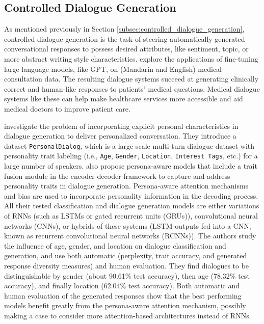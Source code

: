 \subsection{Controlled Dialogue Generation}
As mentioned previously in Section \ref{subsec:controlled_dialogue_generation}, controlled dialogue generation is the task of steering automatically generated conversational responses to possess desired attributes, like sentiment, topic, or more abstract writing style characteristics.
\cite{zeng-etal-2020-meddialog} explore the applications of fine-tuning large language models, like GPT, on (Mandarin and English) medical consultation data. The resulting dialogue systems succeed at generating clinically correct and human-like responses to patients' medical questions. Medical dialogue systems like these can help make healthcare services more accessible and aid medical doctors to improve patient care.

\cite{zheng2019personalized} investigate the problem of incorporating explicit personal characteristics in dialogue generation to deliver personalized conversation. They introduce a dataset \texttt{PersonalDialog}, which is a large-scale multi-turn dialogue dataset with personality trait labeling (i.e., \texttt{Age}, \texttt{Gender}, \texttt{Location}, \texttt{Interest Tags}, etc.) for a large number of speakers. \cite{zheng2019personalized} also propose persona-aware models that include a trait fusion module in the encoder-decoder framework to capture and address personality traits in dialogue generation. Persona-aware attention mechanisms and bias are used to incorporate personality information in the decoding process. All their tested classification and dialogue generation models are either variations of RNNs (such as LSTMs or gated recurrent units (GRUs)), convolutional neural networks (CNNs), or hybrids of these systems (LSTM-outputs fed into a CNN, known as recurrent convolutional neural networks (RCNNs)). The authors study the influence of age, gender, and location on dialogue classification and generation, and use both automatic (perplexity, trait accuracy, and generated response diversity measures) and human evaluation. They find dialogues to be distinguishable by gender (about 90.61\% test accuracy), then age (78.32\% test accuracy), and finally location (62.04\% test accuracy). Both automatic and human evaluation of the generated responses show that the best performing models benefit greatly from the persona-aware attention mechanism, possibly making a case to consider more attention-based architectures instead of RNNs.

